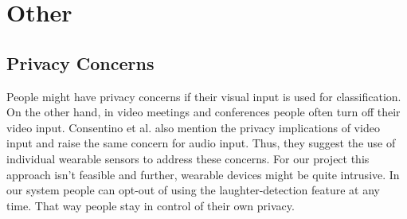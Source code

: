 \documentclass[bsc,frontabs,parskip,deptreport]{infthesis}
\begin{document}
\chapter{Other}
\section{Privacy Concerns}\label{privacy-concerns}
People might have privacy concerns if their visual input is used for classification.
On the other hand, in video meetings and conferences people often turn off their video input.
Consentino et al. \cite{cosentino2016quantitative} also mention the privacy implications of video input and raise the same concern for audio input.
Thus, they suggest the use of individual wearable sensors to address these concerns.
For our project this approach isn't feasible and further, wearable devices might be quite intrusive.
In our system people can opt-out of using the laughter-detection feature at any time.
That way people stay in control of their own privacy.



%
%
%
\end{document}
